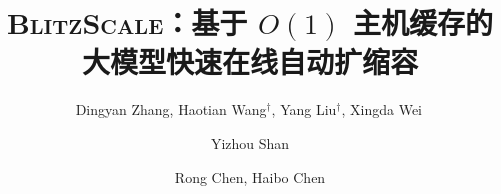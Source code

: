 \documentclass[10pt,sigplan,letterpaper,twocolumn]{article}
\begin{document}
\title{\Large \bf{{\textsc{BlitzScale}}：基于 $O(1)$ 主机缓存的大模型快速在线自动扩缩容}}

\setlength{\affilsep}{0.5em}
\author[1]{Dingyan Zhang, Haotian Wang$^\dagger$, Yang Liu$^\dagger$, Xingda Wei\,{\Envelope}}
\author[2]{Yizhou Shan}
\author[1]{Rong Chen, Haibo Chen}


\date{}
\maketitle
\def\thefootnote{$\dagger$}
\def\thefootnote{\Envelope}
\def\thefootnote{}

\renewcommand{\thefootnote}{\arabic{footnote}}

\frenchspacing











\balance

\small{


}

\twocolumn
\appendix


\clearpage
\end{document}
